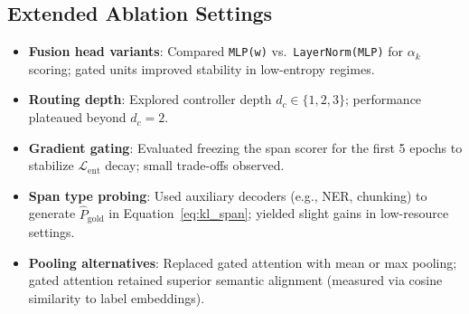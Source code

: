 \subsection{Extended Ablation Settings}
\label{sec:ablation-settings}

\begin{itemize}[leftmargin=1.5em]
	\item \textbf{Fusion head variants}: Compared \texttt{MLP(w)} vs.\ \texttt{LayerNorm(MLP)} for $\alpha_k$ scoring; gated units improved stability in low-entropy regimes.
	\item \textbf{Routing depth}: Explored controller depth $d_c \in \{1,2,3\}$; performance plateaued beyond $d_c=2$.
	\item \textbf{Gradient gating}: Evaluated freezing the span scorer for the first 5 epochs to stabilize $\mathcal{L}_{\mathrm{ent}}$ decay; small trade-offs observed.
	\item \textbf{Span type probing}: Used auxiliary decoders (e.g., NER, chunking) to generate $\hat{P}_{\mathrm{gold}}$ in Equation~\eqref{eq:kl_span}; yielded slight gains in low-resource settings.
	\item \textbf{Pooling alternatives}: Replaced gated attention with mean or max pooling; gated attention retained superior semantic alignment (measured via cosine similarity to label embeddings).
\end{itemize}

